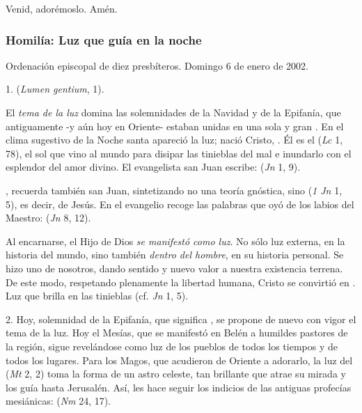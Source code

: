 Venid, adorémoslo. Amén.

\subsubsection{Homilía: Luz que guía en la noche}

Ordenación episcopal de diez presbíteros. Domingo 6 de enero de 2002.

1.  (\emph{Lumen gentium}, 1).

El \emph{tema de la luz} domina las solemnidades de la Navidad y de la Epifanía, que antiguamente -y aún hoy en Oriente- estaban unidas en una sola y gran . En el clima sugestivo de la Noche santa apareció la luz; nació Cristo, . Él es el  (\emph{Lc} 1, 78), el sol que vino al mundo para disipar las tinieblas del mal e inundarlo con el esplendor del amor divino. El evangelista san Juan escribe:  (\emph{Jn} 1, 9).

, recuerda también san Juan, sintetizando no una teoría gnóstica, sino  (\emph{1 Jn} 1, 5), es decir, de Jesús. En el evangelio recoge las palabras que oyó de los labios del Maestro:  (\emph{Jn} 8, 12).

Al encarnarse, el Hijo de Dios \emph{se manifestó como luz}. No sólo luz externa, en la historia del mundo, sino también \emph{dentro del hombre}, en su historia personal. Se hizo uno de nosotros, dando sentido y nuevo valor a nuestra existencia terrena. De este modo, respetando plenamente la libertad humana, Cristo se convirtió en . Luz que brilla en las tinieblas (cf. \emph{Jn} 1, 5).

2. Hoy, solemnidad de la Epifanía, que significa , se propone de nuevo con vigor el tema de la luz. Hoy el Mesías, que se manifestó en Belén a humildes pastores de la región, sigue revelándose como luz de los pueblos de todos los tiempos y de todos los lugares. Para los Magos, que acudieron de Oriente a adorarlo, la luz del  (\emph{Mt} 2, 2) toma la forma de un astro celeste, tan brillante que atrae su mirada y los guía hasta Jerusalén. Así, les hace seguir los indicios de las antiguas profecías mesiánicas:  (\emph{Nm} 24, 17).

